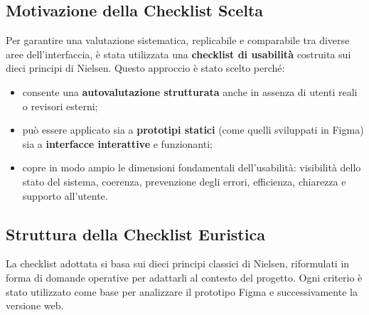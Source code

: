 \subsection*{Motivazione della Checklist Scelta}

Per garantire una valutazione sistematica, replicabile e comparabile tra diverse aree dell’interfaccia, è stata utilizzata una \textbf{checklist di usabilità} costruita sui dieci principi di Nielsen.  
Questo approccio è stato scelto perché:
\begin{itemize}
    \item consente una \textbf{autovalutazione strutturata} anche in assenza di utenti reali o revisori esterni;
    \item può essere applicato sia a \textbf{prototipi statici} (come quelli sviluppati in Figma) sia a \textbf{interfacce interattive} e funzionanti;
    \item copre in modo ampio le dimensioni fondamentali dell’usabilità: visibilità dello stato del sistema, coerenza, prevenzione degli errori, efficienza, chiarezza e supporto all’utente.
\end{itemize}

\subsection*{Struttura della Checklist Euristica}

La checklist adottata si basa sui dieci principi classici di Nielsen, riformulati in forma di domande operative per adattarli al contesto del progetto.  
Ogni criterio è stato utilizzato come base per analizzare il prototipo Figma e successivamente la versione web.

